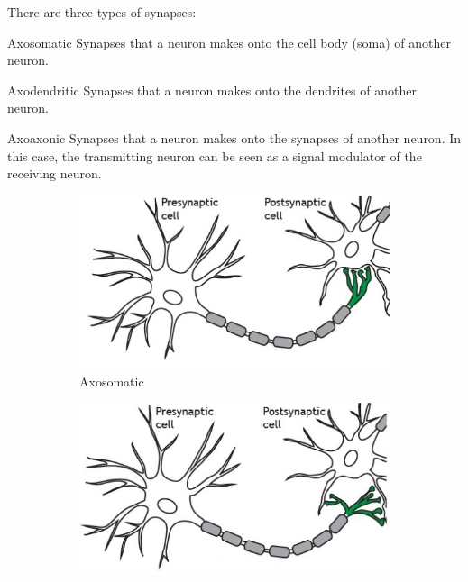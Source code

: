 There are three types of synapses:
\begin{descriptionlist}
    \item[Axosomatic] 
        Synapses that a neuron makes onto the cell body (soma) of another neuron.
    \item[Axodendritic] 
        Synapses that a neuron makes onto the dendrites of another neuron.
    \item[Axoaxonic] 
        Synapses that a neuron makes onto the synapses of another neuron.
        In this case, the transmitting neuron can be seen as a signal modulator of the receiving neuron.
    \begin{figure}[H]
        \begin{subfigure}{.3\textwidth}
            \centering
            \includegraphics[width=\linewidth]{./img/axosomatic.png}
            \caption{Axosomatic}
        \end{subfigure}
        \begin{subfigure}{.3\textwidth}
            \centering
            \includegraphics[width=\linewidth]{./img/axodendritic.png}

\end{subfigure}
\end{figure}
\end{descriptionlist}
